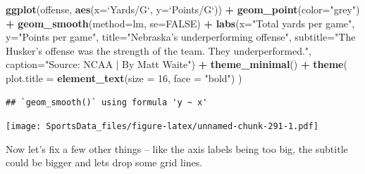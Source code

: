\documentclass[
]{book}
\newenvironment{Shaded}{\begin{snugshade}}{\end{snugshade}}
\newcommand{\DataTypeTok}[1]{\textcolor[rgb]{0.13,0.29,0.53}{#1}}
\newcommand{\DecValTok}[1]{\textcolor[rgb]{0.00,0.00,0.81}{#1}}
\newcommand{\KeywordTok}[1]{\textcolor[rgb]{0.13,0.29,0.53}{\textbf{#1}}}
\newcommand{\NormalTok}[1]{#1}
\newcommand{\OperatorTok}[1]{\textcolor[rgb]{0.81,0.36,0.00}{\textbf{#1}}}
\newcommand{\OtherTok}[1]{\textcolor[rgb]{0.56,0.35,0.01}{#1}}
\newcommand{\StringTok}[1]{\textcolor[rgb]{0.31,0.60,0.02}{#1}}
\begin{document}
\begin{Shaded}
\begin{Highlighting}[]
\KeywordTok{ggplot}\NormalTok{(offense, }\KeywordTok{aes}\NormalTok{(}\DataTypeTok{x=}\StringTok{`}\DataTypeTok{Yards/G}\StringTok{`}\NormalTok{, }\DataTypeTok{y=}\StringTok{`}\DataTypeTok{Points/G}\StringTok{`}\NormalTok{)) }\OperatorTok{+}\StringTok{ }
\StringTok{  }\KeywordTok{geom_point}\NormalTok{(}\DataTypeTok{color=}\StringTok{"grey"}\NormalTok{) }\OperatorTok{+}\StringTok{ }\KeywordTok{geom_smooth}\NormalTok{(}\DataTypeTok{method=}\NormalTok{lm, }\DataTypeTok{se=}\OtherTok{FALSE}\NormalTok{) }\OperatorTok{+}\StringTok{ }
\StringTok{  }\KeywordTok{labs}\NormalTok{(}\DataTypeTok{x=}\StringTok{"Total yards per game"}\NormalTok{, }\DataTypeTok{y=}\StringTok{"Points per game"}\NormalTok{, }\DataTypeTok{title=}\StringTok{"Nebraska's underperforming offense"}\NormalTok{, }\DataTypeTok{subtitle=}\StringTok{"The Husker's offense was the strength of the team. They underperformed."}\NormalTok{, }\DataTypeTok{caption=}\StringTok{"Source: NCAA | By Matt Waite"}\NormalTok{) }\OperatorTok{+}\StringTok{ }
\StringTok{  }\KeywordTok{theme_minimal}\NormalTok{() }\OperatorTok{+}\StringTok{ }
\StringTok{  }\KeywordTok{theme}\NormalTok{(}
    \DataTypeTok{plot.title =} \KeywordTok{element_text}\NormalTok{(}\DataTypeTok{size =} \DecValTok{16}\NormalTok{, }\DataTypeTok{face =} \StringTok{"bold"}\NormalTok{)}
\NormalTok{    ) }
\end{Highlighting}
\end{Shaded}

\begin{verbatim}
## `geom_smooth()` using formula 'y ~ x'
\end{verbatim}

\texttt{[image: SportsData\_files/figure-latex/unnamed-chunk-291-1.pdf]}

Now let's fix a few other things -- like the axis labels being too big, the subtitle could be bigger and lets drop some grid lines.
\end{document}

